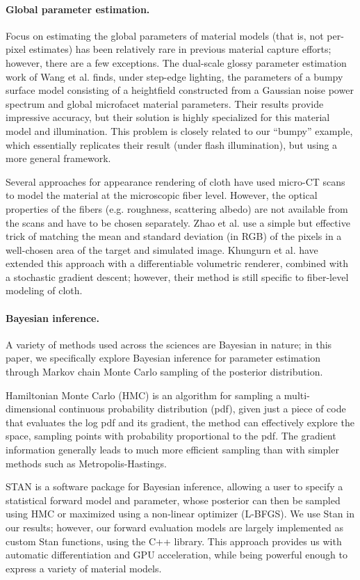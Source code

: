 \paragraph{Global parameter estimation.} Focus on estimating the global parameters of material models (that is, not per-pixel estimates) has been relatively rare in previous material capture efforts; however, there are a few exceptions. The dual-scale glossy parameter estimation work of Wang et al.  finds, under step-edge lighting, the parameters of a bumpy surface model consisting of a heightfield constructed from a Gaussian noise power spectrum and global microfacet material parameters. Their results provide impressive accuracy, but their solution is highly specialized for this material model and illumination. This problem is closely related to our ``bumpy'' example, which essentially replicates their result (under flash illumination), but using a more general framework.

Several approaches for appearance rendering of cloth have used micro-CT scans to model the material at the microscopic fiber level. However, the optical properties of the fibers (e.g. roughness, scattering albedo) are not available from the scans and have to be chosen separately. Zhao et al.  use a simple but effective trick of matching the mean and standard deviation (in RGB) of the pixels in a well-chosen area of the target and simulated image. Khungurn et al.  have extended this approach with a differentiable volumetric renderer, combined with a stochastic gradient descent; however, their method is still specific to fiber-level modeling of cloth.


\paragraph{Bayesian inference.} A variety of methods used across the sciences are Bayesian in nature; in this paper, we specifically explore Bayesian inference for parameter estimation through Markov chain Monte Carlo sampling of the posterior distribution.

Hamiltonian Monte Carlo (HMC) \cite{Neal2012,Betancourt2017} is an algorithm for sampling a multi-dimensional continuous probability distribution (pdf), given just a piece of code that evaluates the log pdf and its gradient, the method can effectively explore the space, sampling points with probability proportional to the pdf. The gradient information generally leads to much more efficient sampling than with simpler methods such as Metropolis-Hastings.

STAN \cite{Stan} is a software package for Bayesian inference, allowing a user to specify a statistical forward model and parameter, whose posterior can then be sampled using HMC or maximized using a non-linear optimizer (L-BFGS). We use Stan in our results; however, our forward evaluation models are largely implemented as custom Stan functions, using the \torch C++ library. This approach provides us with automatic differentiation and GPU acceleration, while being powerful enough to express a variety of material models.



